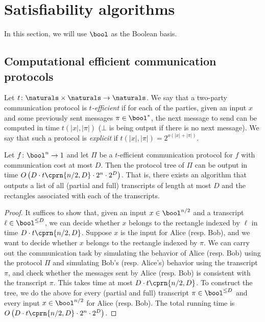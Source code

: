 \setcounter{section}{4}
\setcounter{theorem}{39}
    \section{Satisfiability algorithms}\label{sec:sat}
	
	In this section, we will use $\bool$ as the Boolean basis.
	
	\subsection{Computational efficient communication protocols}
	
	\begin{definition}
	    Let $t\colon\naturals\times\naturals\to\naturals$. We say that a two-party communication protocol is \emph{$t$-efficient} if for each of the parties, given an input $x$ and some previously sent messages $\pi\in\bool^{*}$, the next message to send can be computed in time $t(|x|,|\pi|)$ ($\bot$ is being output if there is no next message). We say that such a protocol is \emph{explicit} if $t(|x|,|\pi|)=2^{o(|x|+|\pi|)}$.
	\end{definition}

	\begin{lemma}\label{lem:sat-time-efficient}
        Let $f\colon\bool^n\to 1$ and let $\Pi$ be a $t$-efficient communication protocol for $f$ with communication cost at most $D$. Then the protocol tree of $\Pi$ can be output in time $O\left(D\cdot t\cprn{n/2,D}\cdot2^{n}\cdot2^D\right)$. That is, there exists an algorithm that outputs a list of all (partial and full) transcripts of length at most $D$ and the rectangles associated with each of the transcripts.
	\end{lemma}
	
	\begin{proof}
	    It suffices to show that, given an input $x\in\bool^{n/2}$ and a transcript $\ell\in\bool^{\leq D}$, we can decide whether $x$ belongs to the rectangle indexed by $\ell$ in time $D\cdot t\cprn{n/2,D}$.
	    Suppose $x$ is the input for Alice (resp. Bob), and we want to decide whether $x$ belongs to the rectangle indexed by $\pi$. We can carry out the communication task by simulating the behavior of Alice (resp. Bob) using the protocol $\Pi$ and simulating Bob's (resp. Alice's) behavior using the transcript $\pi$, and check whether the messages sent by Alice (resp. Bob) is consistent with the transcript $\pi$. This takes time at most $D\cdot t\cprn{n/2,D}$. To construct the tree, we do the above for every (partial and full) transcript $\pi\in\bool^{\leq D}$ and every input $x\in\bool^{n/2}$ for Alice (resp. Bob). The total running time is $O\left(D\cdot t\cprn{n/2,D}\cdot2^{n}\cdot2^D\right)$.
	\end{proof}
	
